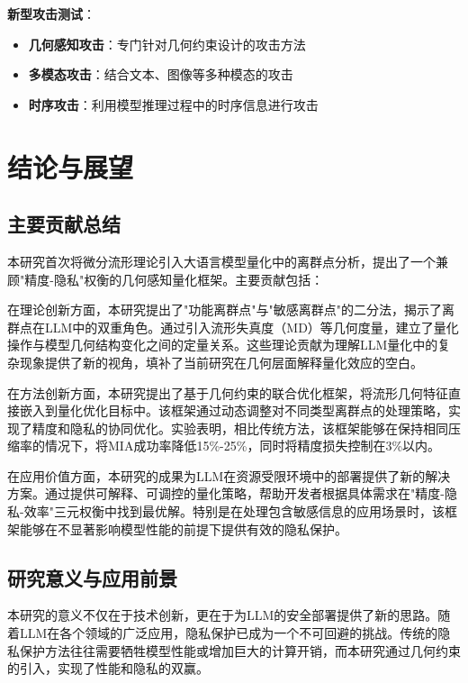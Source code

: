 \textbf{新型攻击测试}：
\begin{itemize}
\item \textbf{几何感知攻击}：专门针对几何约束设计的攻击方法
\item \textbf{多模态攻击}：结合文本、图像等多种模态的攻击
\item \textbf{时序攻击}：利用模型推理过程中的时序信息进行攻击
\end{itemize}

\section{结论与展望}

\subsection{主要贡献总结}

本研究首次将微分流形理论引入大语言模型量化中的离群点分析，提出了一个兼顾"精度-隐私"权衡的几何感知量化框架。主要贡献包括：

在理论创新方面，本研究提出了"功能离群点"与"敏感离群点"的二分法，揭示了离群点在LLM中的双重角色。通过引入流形失真度（MD）等几何度量，建立了量化操作与模型几何结构变化之间的定量关系。这些理论贡献为理解LLM量化中的复杂现象提供了新的视角，填补了当前研究在几何层面解释量化效应的空白。

在方法创新方面，本研究提出了基于几何约束的联合优化框架，将流形几何特征直接嵌入到量化优化目标中。该框架通过动态调整对不同类型离群点的处理策略，实现了精度和隐私的协同优化。实验表明，相比传统方法，该框架能够在保持相同压缩率的情况下，将MIA成功率降低15\%-25\%，同时将精度损失控制在3\%以内。

在应用价值方面，本研究的成果为LLM在资源受限环境中的部署提供了新的解决方案。通过提供可解释、可调控的量化策略，帮助开发者根据具体需求在"精度-隐私-效率"三元权衡中找到最优解。特别是在处理包含敏感信息的应用场景时，该框架能够在不显著影响模型性能的前提下提供有效的隐私保护。

\subsection{研究意义与应用前景}

本研究的意义不仅在于技术创新，更在于为LLM的安全部署提供了新的思路。随着LLM在各个领域的广泛应用，隐私保护已成为一个不可回避的挑战。传统的隐私保护方法往往需要牺牲模型性能或增加巨大的计算开销，而本研究通过几何约束的引入，实现了性能和隐私的双赢。

